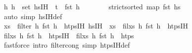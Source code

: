 \begin{isabellebody}
\ {\isachardoublequoteopen}{\isasymAnd}h{\isacharprime}{\kern0pt}{\isachardot}{\kern0pt}\ h{\isacharprime}{\kern0pt}\ {\isasymin}\ set\ {\isacharparenleft}{\kern0pt}hs{\isacharprime}{\kern0pt}{\isacharunderscore}{\kern0pt}IH{\isacharparenright}{\kern0pt}\ {\isasymLongrightarrow}\ t{\isacharprime}{\kern0pt}\ {\isasymnoteq}\ fst\ h{\isacharprime}{\kern0pt}{\isachardoublequoteclose}\isanewline
\ \ \ \ \ \ \isamarkupfalse%
\ {\isacartoucheopen}strict{\isacharunderscore}{\kern0pt}sorted\ {\isacharparenleft}{\kern0pt}map\ fst\ hs{\isacharprime}{\kern0pt}{\isacharparenright}{\kern0pt}{\isacartoucheclose}\isanewline
\ \ \ \ \ \ \isamarkupfalse%
\ {\isacharparenleft}{\kern0pt}auto\ simp{\isacharcolon}{\kern0pt}\ hs{\isacharprime}{\kern0pt}{\isacharunderscore}{\kern0pt}IH{\isacharunderscore}{\kern0pt}def{\isacharparenright}{\kern0pt}\isanewline
\isanewline
\ \ \ \ \isamarkupfalse%
\ {\isachardoublequoteopen}xs\ {\isacharequal}{\kern0pt}\ filter\ {\isacharparenleft}{\kern0pt}{\isasymlambda}h{\isachardot}{\kern0pt}\ fst\ h\ {\isasymin}\ htps{\isacharunderscore}{\kern0pt}IH{\isacharparenright}{\kern0pt}\ {\isacharparenleft}{\kern0pt}hs{\isacharunderscore}{\kern0pt}IH{\isacharparenright}{\kern0pt}{\isachardoublequoteclose}\ {\isacharparenleft}{\kern0pt}\ {\isachardoublequoteopen}{\isacharquery}{\kern0pt}xs\ {\isacharequal}{\kern0pt}\ {\isacharquery}{\kern0pt}fil{\isacharunderscore}{\kern0pt}xs\ {\isacharparenleft}{\kern0pt}{\isasymlambda}h{\isachardot}{\kern0pt}\ fst\ h\ {\isasymin}\ htps{\isacharunderscore}{\kern0pt}IH{\isacharparenright}{\kern0pt}{\isachardoublequoteclose}{\isacharparenright}{\kern0pt}\isanewline
\ \ \ \ \isamarkupfalse%
{\isacharminus}{\kern0pt}\isanewline
\ \ \ \ \ \ \isamarkupfalse%
\ {\isachardoublequoteopen}{\isacharquery}{\kern0pt}fil{\isacharunderscore}{\kern0pt}xs\ {\isacharparenleft}{\kern0pt}{\isasymlambda}h{\isachardot}{\kern0pt}\ fst\ h\ {\isasymin}\ htps{\isacharunderscore}{\kern0pt}IH{\isacharparenright}{\kern0pt}\ {\isacharequal}{\kern0pt}\ {\isacharquery}{\kern0pt}fil{\isacharunderscore}{\kern0pt}xs\ {\isacharparenleft}{\kern0pt}{\isasymlambda}h{\isachardot}{\kern0pt}\ fst\ h\ {\isasymin}\ htps{\isacharparenright}{\kern0pt}{\isachardoublequoteclose}\isanewline
\ \ \ \ \ \ \ \ \isamarkupfalse%
\ {\isacharparenleft}{\kern0pt}fastforce\ intro{\isacharbang}{\kern0pt}{\isacharcolon}{\kern0pt}\ filter{\isacharunderscore}{\kern0pt}cong\ simp{\isacharcolon}{\kern0pt}\ htps{\isacharunderscore}{\kern0pt}IH{\isacharunderscore}{\kern0pt}def{\isacharparenright}{\kern0pt}\isanewline

\end{isabellebody}
